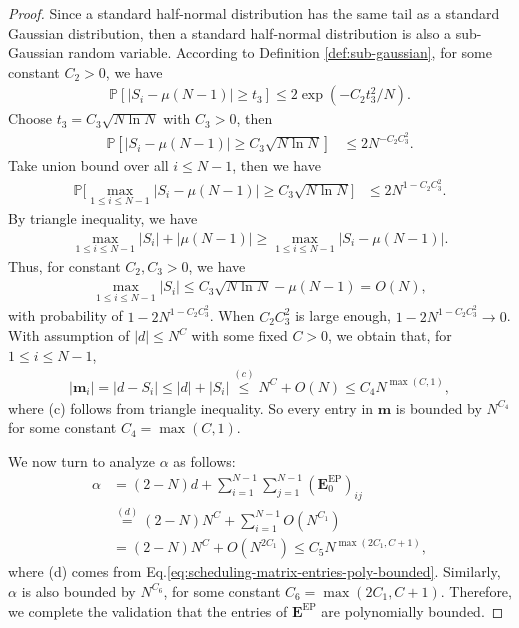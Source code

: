 \documentclass[lettersize,journal]{IEEEtran}
\newcommand{\GEP}{\boldsymbol{E}^{\mathrm{EP}}}
\newcommand{\prob}[1]{\mathbb{P}\left[#1\right]}
\begin{document}
{\begin{proof}
Since a standard half-normal distribution has the same tail as a standard Gaussian distribution, then a standard half-normal distribution is also a sub-Gaussian random variable. According to Definition \ref{def:sub-gaussian}, for some constant $C_2>0$, we have
\begin{align*}
    \prob{|S_i - \mu(N-1)|\geq t_3} \leq 2\exp(-C_2 t_3^2/N).
\end{align*}
Choose $t_3 = C_3\sqrt{N\ln N}$ with $C_3>0$, then
\begin{align*}
    \prob{|S_i - \mu(N-1)|\geq C_3\sqrt{N\ln N}}  
    &\leq 2N^{-C_2C_3^2}.
\end{align*}
Take union bound over all $i\leq N-1$, then we have
\begin{align*}
    \mathbb{P}\Big[\max_{1\leq i\leq N-1} |S_i - \mu(N-1)|\geq C_3\sqrt{N\ln N}\Big]&\leq 2N^{1-C_2C_3^2}.
\end{align*}
By triangle inequality, we have
\begin{align*}
    \max_{1\leq i\leq N-1} |S_i| + |\mu(N-1)| \geq \max_{1\leq i\leq N-1} |S_i - \mu(N-1)|.
\end{align*}
Thus, for constant $C_2, C_3 >0$, we have
\begin{align*}
    \max_{1\leq i\leq N-1} |S_i| \leq C_3 \sqrt{N\ln N} - \mu(N-1) = O(N),
\end{align*}
with probability of $1-2N^{1-C_2C_3^2}$. When $C_2C_3^2$ is large enough, $1-2N^{1-C_2C_3^2}\rightarrow 0$.
With assumption of $|d|\leq N^{C}$ with some fixed $C>0$, we obtain that, for $1\leq i\leq N-1$,
\begin{align*}
    |\boldsymbol{m}_i| = |d-S_i| \leq |d|+|S_i| \overset{(c)}{\leq} N^{C} + O(N) \leq C_4N^{\max(C, 1)},
\end{align*}
where (c) follows from triangle inequality.
So every entry in $\boldsymbol{m}$ is bounded by $N^{C_4}$ for some constant $C_4 = \max(C, 1)$.

We now turn to analyze $\alpha$ as follows:
\begin{align*}
    \alpha &= (2-N)d + \textstyle\sum_{i=1}^{N-1}\sum_{j=1}^{N-1} (\GEP_0)_{ij}\\
    &\overset{(d)}{=}(2-N)N^{C} + \textstyle\sum_{i=1}^{N-1} O(N^{C_1})\\
    &= (2-N)N^{C} + O(N^{2C_1}) \leq C_5 N^{\max(2C_1, C+1)},
\end{align*}
where (d) comes from Eq.\eqref{eq:scheduling-matrix-entries-poly-bounded}.
Similarly, $\alpha$ is also bounded by $N^{C_6}$, for some constant $C_6 = \max(2C_1, C+1)$. Therefore, we complete the validation that the entries of $\GEP$ are polynomially bounded.


\end{proof}}
\end{document}
